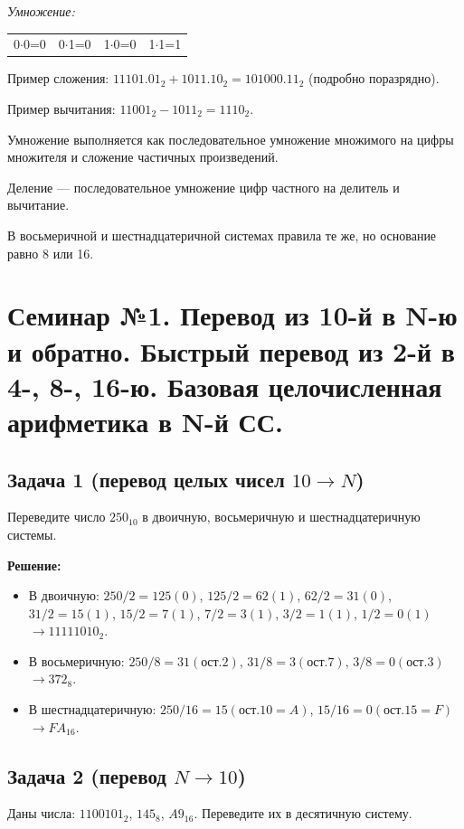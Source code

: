\documentclass[a4paper,14pt]{report}
\begin{document}
\textit{Умножение:}
\begin{center}
\begin{tabular}{c|c|c|c}
0$\cdot$0=0 & 0$\cdot$1=0 & 1$\cdot$0=0 & 1$\cdot$1=1
\end{tabular}
\end{center}

Пример сложения: $11101.01_2 + 1011.10_2 = 101000.11_2$ (подробно поразрядно).

Пример вычитания: $11001_2 - 1011_2 = 1110_2$.

Умножение выполняется как последовательное умножение множимого на цифры множителя и сложение частичных произведений.

Деление — последовательное умножение цифр частного на делитель и вычитание.

В восьмеричной и шестнадцатеричной системах правила те же, но основание равно 8 или 16.

\section{Семинар №1. Перевод из 10-й в N-ю и обратно. Быстрый перевод из 2-й в 4-, 8-, 16-ю. Базовая целочисленная арифметика в N-й СС.}

\subsection*{Задача 1 (перевод целых чисел $10 \to N$)}
Переведите число $250_{10}$ в двоичную, восьмеричную и шестнадцатеричную системы.

\textbf{Решение:}
\begin{itemize}
    \item В двоичную: $250 / 2 = 125 (0)$, $125/2=62 (1)$, $62/2=31 (0)$, $31/2=15 (1)$, $15/2=7 (1)$, $7/2=3 (1)$, $3/2=1 (1)$, $1/2=0 (1)$ $\to 11111010_2$.
    \item В восьмеричную: $250 / 8 = 31 (ост. 2)$, $31/8=3 (ост. 7)$, $3/8=0 (ост. 3)$ $\to 372_8$.
    \item В шестнадцатеричную: $250 / 16 = 15 (ост. 10=A)$, $15/16=0 (ост. 15=F)$ $\to FA_{16}$.
\end{itemize}

\subsection*{Задача 2 (перевод $N \to 10$)}
Даны числа: $1100101_2$, $145_8$, $A9_{16}$. Переведите их в десятичную систему.
\end{document}
